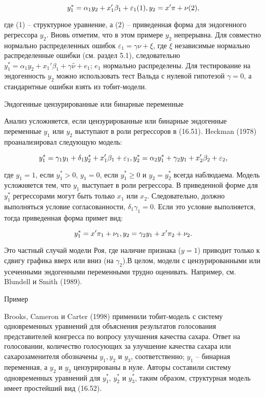 \begin{equation}
y_1^{*}=\alpha_1{y_2}+x_1'\beta_1+\varepsilon_1 (1),\\
y_2=x'\pi+\nu (2),
\end{equation}

где (1) -- структурное уравнение, а (2) -- приведенная форма для эндогенного регрессора $y_2$. Вновь отметим, что в этом примере $y_2$ непрерывна. Для совместно нормально распределенных ошибок $\varepsilon_1=\gamma\nu+\xi$, где $\xi$ независимые нормально распределенные ошибки (см. раздел 5.1), следовательно $y_1^{*}=\alpha_1{y_2}+x_1'\beta_1+\gamma\hat{\nu}+e_1$; $e_1$ нормально распределены. Для тестирование на эндогенность $y_2$ можно использовать тест Вальда с нулевой гипотезой $\gamma=0$, а стандарнтные ошибки взять из тобит-модели.

Эндогенные цензурированные или бинарные переменные

Анализ усложняется, если цензурированные или бинарные эндогенные переменные $y_1$ или $y_2$ выступают в роли регрессоров в (16.51). Heckman (1978) проанализировал следующую модель:

\begin{equation}
y_1^{*}=\gamma_1{y_1}+\delta_1{y_2^{*}}+x_1'\beta_1+\varepsilon_1, \\
y_2^{*}=\alpha_2{y_1^{*}}+\gamma_2{y_1}+x_2'\beta_2+\varepsilon_2,
\end{equation}

где $y_1=1$, если $y_1^{*}>0$, $y_1=0$, если $y_1^{*}{\geq}0$ и $y_2=y_2^{*}$ всегда наблюдаема. Модель усложняется тем, что $y_1$ выступает в роли регрессора. В приведенной форме для $y_1^{*}$ регрессорами могут быть только $x_1$ или $x_2$. Следовательно, должно выполняться условие согласованности, $\delta_1\gamma_1=0$. Если это условие выполняется, тогда приведенная форма примет вид:

\[
y_1^{*}=x'\pi_1+\nu_1,\\
y_2=\gamma_2{y_1}+x'\pi_2+\nu_2.
\]

Это частный случай модели Роя, где наличие признака ($y=1$) приводит только к сдвигу графика вверх или вниз (на $\gamma_2$).В целом, модели с цензурированными или усеченными эндогенными переменными трудно оценивать. Например, см. Blundell и Smith (1989).

Пример

Brooks, Cameron и Carter (1998) применили тобит-модель с систему одновременных уравнений для объяснения результатов голосования представителей конгресса по вопросу улучшения качества сахара. Ответ на голосовании, количество голосующих за улучшение качества сахара или сахарозаменителя обозначены $y_1, y_2$ и $y_3$, соответственно; $y_1$ -- бинарная переменная, а $y_2$ и $y_3$ цензурированы в нуле. Авторы составили систему одновременных уравнений для $y_1^{*}$, $y_2^{*}$ и $y_3^{*}$, таким образом, структурная модель имеет простейший вид (16.52).

